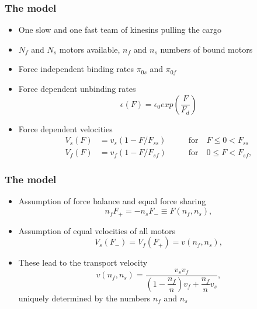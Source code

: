 \documentclass[11pt]{beamer}
\begin{document}
\begin{frame}
  \frametitle{The model}
  \begin{itemize}
  \item
    One slow and one fast team of kinesins pulling the cargo \pause
  \item
    $N_f$ and $N_s$ motors available, $n_f$ and $n_s$ numbers of bound motors \pause
  \item
    Force independent binding rates $\pi_{0s}$ and $\pi_{0f}$
    \pause
  \item
    Force dependent unbinding rates\\
    \begin{equation*}
     \epsilon\left(F\right) = \epsilon_{0} exp\left({\frac{F}{F_{d}}}\right)
    \end{equation*}
    \pause
  \item
    Force dependent velocities
    \begin{equation*}\label{e.linear-velocity}
    \begin{aligned}
      V_s\left(F\right) &= v_s \left(1 - F/F_{ss}\right) \qquad \phantom{_{ff}} \text{for} \quad F \leq 0 < F_{ss} \\
      V_f\left(F\right) &= v_f \left(1 - F/F_{sf}\right) \qquad \phantom{_{ss}} \text{for} \quad 0 \leq F < F_{sf},
    \end{aligned}
    \end{equation*}
  \end{itemize}  
\end{frame}

\begin{frame}
 \frametitle{The model}
 \begin{itemize}
  \item
    Assumption of force balance and equal force sharing\\
    \begin{equation*}\label{e.force-balance}
      n_fF_+ = -n_sF_- \equiv F\left(n_f, n_s\right),
    \end{equation*}
    \pause
  \item
    Assumption of equal velocities of all motors\\
    \begin{equation*}\label{e.equal-velocities}
      V_s\left(F_-\right) = V_f\left(F_+\right) = v\left(n_f, n_s\right),
    \end{equation*}
    \pause  
  \item
    These lead to the transport velocity\\
    \begin{equation*}\label{e.mt-velocity}
      v\left(n_f, n_s\right) = \frac{v_sv_f}{\left(1 - \dfrac{n_f}{n}\right)v_f + \dfrac{n_f}{n}v_s},
    \end{equation*}
    uniquely determined by the numbers $n_f$ and $n_s$
 \end{itemize}
\end{frame}
\end{document}

